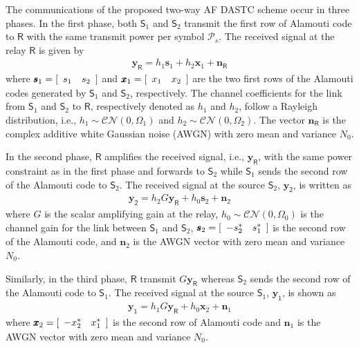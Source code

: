\documentclass[conference]{IEEEtran}
\newcommand{\B}[1]{{\pmb{#1}}}
\newcommand{\CG}[2]{\mathcal{CN}\left({#1},{#2}\right)}
\newcommand{\Source}[1]{\mathsf{S}_{#1}}
\newcommand{\Relay}{\mathsf{R}}
\newcommand{\Ps}{\mathcal{P}_s}
\newcommand{\y}[1]{\B{y}_{\mathsf{{#1}}}}
\newcommand{\h}[1]{h_{#1}}
\newcommand{\s}[1]{\B{s}_{#1}}
\newcommand{\x}[1]{\B{x}_{#1}}
\newcommand{\nR}{\B{n}_{\mathsf{R}}}
\newcommand{\n}[1]{\B{n}_{#1}}
\newcommand{\CP}[1]{\Omega_{#1}}
\newcommand{\Gain}{G}
\begin{document}
The communications of the proposed two-way AF DASTC scheme occur in
three phases. In the first phase, both $\Source{1}$ and $\Source{2}$
transmit the first row of Alamouti code \cite{Ala:98:JSAC} to
$\Relay$ with the same transmit power per symbol $\Ps$. The received
signal at the relay $\Relay$ is given by
%
%
\begin{align} \label{eq:firstphase}
    \y{R} = \h{1} \s{1} + \h{2} \x{1} + \nR
\end{align}
%
%
where $\s{1}= [ {\begin{array}{*{20}c}{s_1 } & {s_2 }  \\
\end{array}}]$ and $\x{1}= [ {\begin{array}{*{20}c}{x_1 } & {x_2 }  \\
\end{array}}]$ are the two first rows of the Alamouti codes generated
by $\Source{1}$ and $\Source{2}$, respectively. The channel
coefficients for the link from $\Source{1}$ and $\Source{2}$ to
$\Relay$, respectively denoted as $\h{1}$ and $\h{2}$, follow a
Rayleigh distribution, i.e., $\h{1} \sim \CG{0}{\CP{1}}$ and $\h{2}
\sim \CG{0}{\CP{2}}$. The vector $\nR$ is the complex additive white
Gaussian noise (AWGN) with zero mean and variance $N_0$.

In the second phase, $\Relay$ amplifies the received signal, i.e.,
$\y{R}$, with the same power constraint as in the first phase and
forwards to $\Source{2}$ while $\Source{1}$ sends the second row of
the Alamouti code to $\Source{2}$. The received signal at the source
$\Source{2}$, $\y{2}$, is written as
%
%
\begin{align} \label{eq:secondphase}
   \y{2}
   =
   \h{2} \Gain \y{R} + \h{0} \s{2} + \n{2}
\end{align}
%
%
where $\Gain$ is the scalar amplifying gain at the relay, $\h{0}
\sim \CG{0}{\CP{0}}$ is the channel gain for the link between
$\Source{1}$ and $\Source{2}$, $\s{2}= [ {\begin{array}{*{20}c}{-s_2^{\ast} } & {s_1^{\ast} }  \\
\end{array}}]$ is the second row of the Alamouti code, and $\n{2}$ is
the AWGN vector with zero mean and variance $N_0$.

Similarly, in the third phase, $\Relay$ transmit $\Gain \y{R}$
whereas $\Source{2}$ sends the second row of the Alamouti code to
$\Source{1}$. The received signal at the source $\Source{1}$,
$\y{1}$, is shown as
%
%
\begin{align} \label{eq:thirdphase}
   \y{1}
   =
   \h{1} \Gain \y{R} + \h{0} \x{2} + \n{1}
\end{align}
%
%
where $\x{2}= [ {\begin{array}{*{20}c}{-x_2^{\ast} } & {x_1^{\ast} }  \\
\end{array}}]$ is the second row of Alamouti code and $\n{1}$ is
the AWGN vector with zero mean and variance $N_0$.
\end{document}
